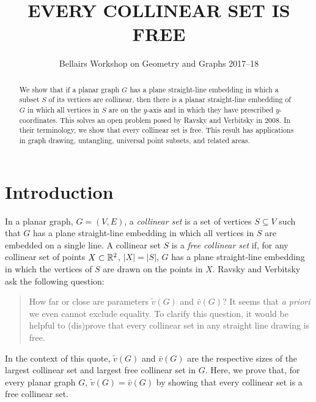 \documentclass{patmorin}
\title{\MakeUppercase{Every Collinear Set is Free}}
\author{Bellairs Workshop on Geometry and Graphs 2017--18}
\begin{document}
\maketitle


\begin{abstract}
  We show that if a planar graph $G$ has a plane straight-line embedding
  in which a subset $S$ of its vertices are collinear, then there is a
  planar straight-line embedding of $G$ in which all vertices in $S$ are
  on the $y$-axis and in which they have prescribed $y$-coordinates.
  This solves an open problem posed by Ravsky and Verbitsky in 2008.
  In their terminology, we show that every collinear set is free.
  This result has applications in graph drawing, untangling, universal
  point subsets, and related areas.
\end{abstract}


\section{Introduction}

In a planar graph, $G=(V,E)$, a \emph{collinear set} is a set of vertices
$S\subseteq V$ such that $G$ has a plane straight-line embedding in which
all vertices in $S$ are embedded on a single line.  A collinear set $S$
is a \emph{free collinear set} if, for any collinear set of points
$X\subset\mathbb{R}^2$, $|X|=|S|$, $G$ has a plane straight-line embedding in
which the vertices of $S$ are drawn on the points in $X$.  Ravsky and
Verbitsky \cite{ravsky.verbitsky:on,ravsky.verbitsky:on-arxiv} ask the
following question:

\begin{quote}
   How far or close are parameters $\tilde{v}(G)$ and $\bar{v}(G)$? It
   seems that \emph{a priori} we even cannot exclude equality. To clarify
   this question, it would be helpful to (dis)prove that every collinear
   set in any straight line drawing is free.
\end{quote}

In the context of this quote, $\tilde{v}(G)$ and $\bar{v}(G)$ are
the respective sizes of the largest collinear set and largest free
collinear set in $G$.  Here, we prove that, for every planar graph $G$,
$\tilde{v}(G)=\bar{v}(G)$ by showing that every collinear set is a free
collinear set.
\end{document}
